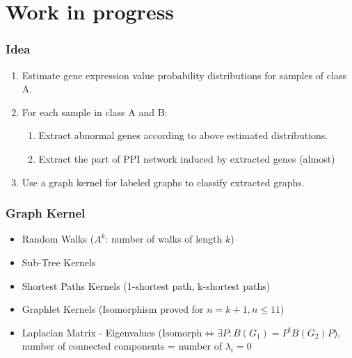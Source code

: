 \documentclass{beamer}
\begin{document}
\section{Work in progress}
\begin{frame}
  \frametitle{Idea}
  \begin{enumerate}
\footnotesize
  \item Estimate gene expression value probability distributions for samples of class A. \pause
  \item For each sample in class A and B:
    \begin{enumerate}
\scriptsize
    \item Extract abnormal genes according to above estimated distributions.
    \item Extract the part of PPI network induced by extracted genes (almost)
    \end{enumerate}\pause
  \item Use a graph kernel for labeled graphs to classify extracted graphs. 
  \end{enumerate}
\end{frame}

\begin{frame}
  \frametitle{Graph Kernel}
  \begin{itemize}
  \item Random Walks ($A^k$: number of walks of length $k$)
  \item Sub-Tree Kernels
  \item Shortest Paths Kernels (1-shortest path, k-shortest paths)
  \item Graphlet Kernels (Isomorphism proved for $n = k + 1 , n \le 11$)
  \item Laplacian Matrix - Eigenvalues ($\text{Isomorph} \iff \exists P: B(G_1) = P^tB(G_2)P$), \\ number of connected components = number of $\lambda_i = 0$
  \end{itemize}
\end{frame}
\end{document}
